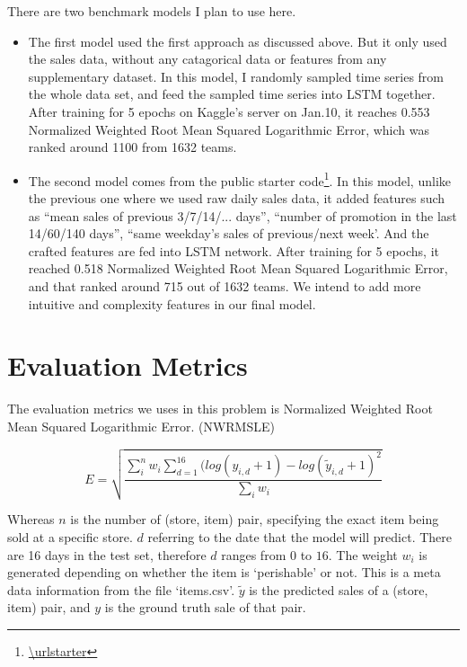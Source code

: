 \documentclass{article}
\begin{document}
There are two benchmark models I plan to use here. 

\begin{itemize}

    \item The first model used the first approach as discussed above. But it only used the sales data, without any catagorical data or features from any supplementary dataset. In this model, I randomly sampled time series from the whole data set, and feed the sampled time series into LSTM together. After training for 5 epochs on Kaggle's server on Jan.10, it reaches 0.553 Normalized Weighted Root Mean Squared Logarithmic Error, which was ranked around 1100 from 1632 teams. 

    \item The second model comes from the public starter code\footnote{\url{\urlstarter}}. In this model, unlike the previous one where we used raw daily sales data, it added features such as ``mean sales of previous 3/7/14/... days'', ``number of promotion in the last 14/60/140 days'',  ``same weekday's sales of previous/next week'. And the crafted features are fed into LSTM network. After training for 5 epochs, it reached 0.518 Normalized Weighted Root Mean Squared Logarithmic Error, and that ranked around 715 out of 1632 teams. We intend to add more intuitive and complexity features in our final model. 

\end{itemize}

\section{Evaluation Metrics}

The evaluation metrics we uses in this problem is Normalized Weighted Root Mean Squared Logarithmic Error. (NWRMSLE)

\begin{equation}
    E=\sqrt{\frac{\sum_i^nw_{i}\sum_{d=1}^{16}(log(y_{i,d}+1)-log(\tilde{y}_{i,d}+1)^2}{\sum_iw_i}}
\end{equation}

Whereas $n$ is the number of (store, item) pair, specifying the exact item being sold at a specific store. $d$ referring to the date that the model will predict. There are 16 days in the test set, therefore $d$ ranges from $0$ to $16$. The weight $w_i$ is generated depending on whether the item is `perishable' or not. This is a meta data information from the file `items.csv'. $\tilde{y}$ is the predicted sales of a (store, item) pair, and $y$ is the ground truth sale of that pair. 
\end{document}
